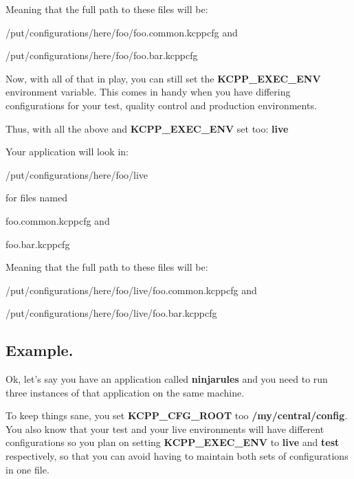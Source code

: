 Meaning that the full path to these files will be\-:
\begin{DoxyItemize}
\item /put/configurations/here/foo/foo.common.\-kcppcfg and
\item /put/configurations/here/foo/foo.bar.\-kcppcfg
\end{DoxyItemize}

Now, with all of that in play, you can still set the {\bfseries K\-C\-P\-P\-\_\-\-E\-X\-E\-C\-\_\-\-E\-N\-V} environment variable. This comes in handy when you have differing configurations for your test, quality control and production environments.

Thus, with all the above and {\bfseries K\-C\-P\-P\-\_\-\-E\-X\-E\-C\-\_\-\-E\-N\-V} set too\-: {\bfseries live}

Your application will look in\-:
\begin{DoxyItemize}
\item /put/configurations/here/foo/live
\item for files named
\begin{DoxyItemize}
\item foo.\-common.\-kcppcfg and
\item foo.\-bar.\-kcppcfg
\end{DoxyItemize}
\end{DoxyItemize}

Meaning that the full path to these files will be\-:
\begin{DoxyItemize}
\item /put/configurations/here/foo/live/foo.common.\-kcppcfg and
\item /put/configurations/here/foo/live/foo.bar.\-kcppcfg
\end{DoxyItemize}

\subsection*{Example.}

Ok, let's say you have an application called {\bfseries ninjarules} and you need to run three instances of that application on the same machine.

To keep things sane, you set {\bfseries K\-C\-P\-P\-\_\-\-C\-F\-G\-\_\-\-R\-O\-O\-T} too {\bfseries /my/central/config}. You also know that your test and your live environments will have different configurations so you plan on setting {\bfseries K\-C\-P\-P\-\_\-\-E\-X\-E\-C\-\_\-\-E\-N\-V} to {\bfseries live} and {\bfseries test} respectively, so that you can avoid having to maintain both sets of configurations in one file.

